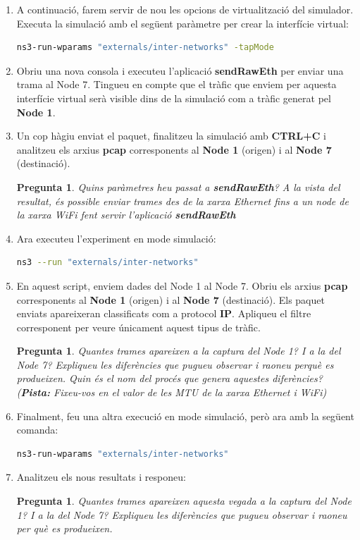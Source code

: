 \documentclass[12pt,a4paper]{article}
\newcounter{exercises}
\newtheorem{exer}[exercises]{Pregunta}
\begin{document}
\begin{enumerate}
\item A continuació, farem servir de nou les opcions de virtualització del simulador. Executa la simulació amb el següent paràmetre per crear la interfície virtual:
\begin{lstlisting}[language=bash]
ns3-run-wparams "externals/inter-networks" -tapMode
\end{lstlisting}
\item Obriu una nova consola i executeu l'aplicació \textbf{sendRawEth} per enviar una trama al Node 7. Tingueu en compte que el tràfic que enviem per aquesta interfície virtual serà visible dins de la simulació com a tràfic generat pel \textbf{Node 1}.

\item Un cop hàgiu enviat el paquet, finalitzeu la simulació amb \textbf{CTRL+C} i analitzeu els arxius \textbf{pcap} corresponents al \textbf{Node 1} (origen) i al \textbf{Node 7} (destinació).

\begin{exer} Quins paràmetres heu passat a \textbf{sendRawEth}? A la vista del resultat, és possible enviar trames des de la xarxa Ethernet fins a un node de la xarxa WiFi fent servir l'aplicació \textbf{sendRawEth} \end{exer}

\item Ara executeu l'experiment en mode simulació:
\begin{lstlisting}[language=bash]
ns3 --run "externals/inter-networks"
\end{lstlisting}

\item En aquest script, enviem dades del Node 1 al Node 7. Obriu els arxius \textbf{pcap} corresponents al \textbf{Node 1} (origen) i al \textbf{Node 7} (destinació). Els paquet enviats apareixeran classificats com a protocol \textbf{IP}. Apliqueu el filtre corresponent per veure únicament aquest tipus de tràfic.

\begin{exer} Quantes trames apareixen a la captura del Node 1? I a la del Node 7? Expliqueu les diferències que pugueu observar i raoneu perquè es produeixen. Quin és el nom del procés que genera aquestes diferències? (\textbf{Pista:} Fixeu-vos en el valor de les MTU de la xarxa Ethernet i WiFi) \end{exer}

\item Finalment, feu una altra execució en mode simulació, però ara amb la següent comanda:
\begin{lstlisting}[language=bash]
   ns3-run-wparams "externals/inter-networks"
\end{lstlisting}
\item Analitzeu els nous resultats i responeu:
\begin{exer} Quantes trames apareixen aquesta vegada a la captura del Node 1? I a la del Node 7? Expliqueu les diferències que pugueu observar i raoneu per què es produeixen.\end{exer}


\end{enumerate}
\end{document}
